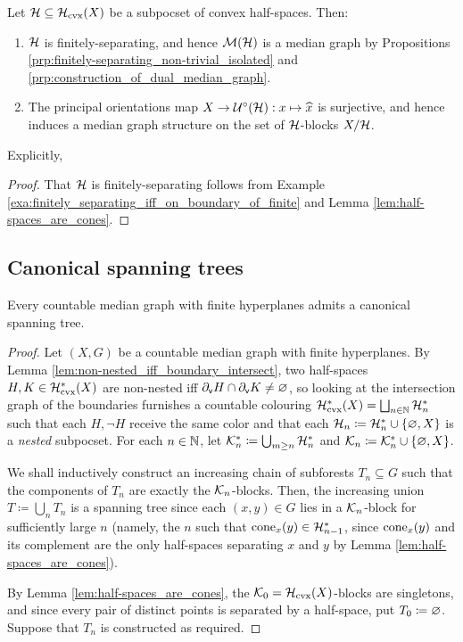 \documentclass{amsart}
\begin{document}
    \begin{proposition}
        Let $\mc{H}\subseteq\mc{H}_\mathrm{cvx}(X)$ be a subpocset of convex half-spaces. Then:
        \begin{enumerate}
            \item $\mc{H}$ is finitely-separating, and hence $\mc{M}(\mc{H})$ is a median graph by Propositions \ref{prp:finitely-separating_non-trivial_isolated} and \ref{prp:construction_of_dual_median_graph}.
            \item The principal orientations map $X\to\mc{U}^\circ(\mc{H}):x\mapsto\widehat{x}$ is surjective, and hence induces a median graph structure on the set of $\mc{H}$-blocks $X/\mc{H}$.
        \end{enumerate}
    \end{proposition}
    Explicitly, {\color{red}{TODO}}
    \begin{proof}
        That $\mc{H}$ is finitely-separating follows from Example \ref{exa:finitely_separating_iff_on_boundary_of_finite} and Lemma \ref{lem:half-spaces_are_cones}.
    \end{proof}

    \subsection{Canonical spanning trees}

    \begin{proposition}\label{prp:canonical_spanning_trees}
        Every countable median graph with finite hyperplanes admits a canonical spanning tree.
    \end{proposition}
    \begin{proof}
        Let $(X,G)$ be a countable median graph with finite hyperplanes. By Lemma \ref{lem:non-nested_iff_boundary_intersect}, two half-spaces $H,K\in\mc{H}^\ast_\textrm{cvx}(X)$ are non-nested iff $\del_\sf{v}H\cap\del_\sf{v}K\neq\em$, so looking at the intersection graph of the boundaries furnishes a countable colouring $\mc{H}^\ast_\textrm{cvx}(X)=\bigsqcup_{n\in\N}\mc{H}^\ast_n$ such that each $H,\lnot H$ receive the same color and that each $\mc{H}_n\coloneqq\mc{H}_n^\ast\cup\l\{\em,X\r\}$ is a \textit{nested} subpocset. For each $n\in\N$, let $\mc{K}_n^\ast\coloneqq\bigcup_{m\geq n}\mc{H}_n^\ast$ and $\mc{K}_n\coloneqq\mc{K}_n^\ast\cup\l\{\em,X\r\}$.

        We shall inductively construct an increasing chain of subforests $T_n\subseteq G$ such that the components of $T_n$ are exactly the $\mc{K}_n$-blocks. Then, the increasing union $T\coloneqq\bigcup_nT_n$ is a spanning tree since each $(x,y)\in G$ lies in a $\mc{K}_n$-block for sufficiently large $n$ (namely, the $n$ such that $\cone_x(y)\in\mc{H}^\ast_{n-1}$, since $\cone_x(y)$ and its complement are the only half-spaces separating $x$ and $y$ by Lemma \ref{lem:half-spaces_are_cones}).

        By Lemma \ref{lem:half-spaces_are_cones}, the $\mc{K}_0=\mc{H}_\textrm{cvx}(X)$-blocks are singletons, and since every pair of distinct points is separated by a half-space, put $T_0\coloneqq\em$. Suppose that $T_n$ is constructed as required.
    \end{proof}
\end{document}
